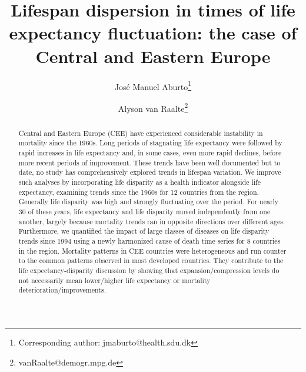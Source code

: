 \documentclass{article}
\title{Lifespan dispersion in times of life expectancy fluctuation: the case of Central and Eastern Europe}
\author[1,2]{Jos\'e Manuel Aburto\thanks{Corresponding author: jmaburto@health.sdu.dk}}
\author[2]{Alyson van Raalte\thanks{vanRaalte@demogr.mpg.de}}
\affil[1]{Interdisciplinary Center for Research and Education on Population Change, Department of Public Health, University of Southern Denmark}
\affil[2]{Max Planck Institute for Demographic Research}
\date{}
\begin{document}
\maketitle

\begin{abstract}
Central and Eastern Europe (CEE) have experienced considerable instability in mortality since the 1960s. Long periods of stagnating life expectancy were followed by rapid increases in life expectancy and, in some cases, even more rapid declines, before more recent periods of improvement. These trends have been well documented but to date, no study has comprehensively explored trends in lifespan variation.  We improve such analyses by incorporating life disparity as a health indicator alongside life expectancy, examining trends since the 1960s for 12 countries from the region. Generally life disparity was high and strongly fluctuating over the period. For nearly 30 of these years, life expectancy and life disparity moved independently from one another, largely because mortality trends ran in opposite directions over different ages. Furthermore, we quantified the impact of large classes of diseases on life disparity trends since 1994 using a newly harmonized cause of death time series for 8 countries in the region. Mortality patterns in CEE countries were heterogeneous and run counter to the common patterns observed in most developed countries. They contribute to the life expectancy-disparity discussion by showing that expansion/compression levels do not necessarily mean lower/higher life expectancy or mortality deterioration/improvements.
\end{abstract}


\newpage
\end{document}
